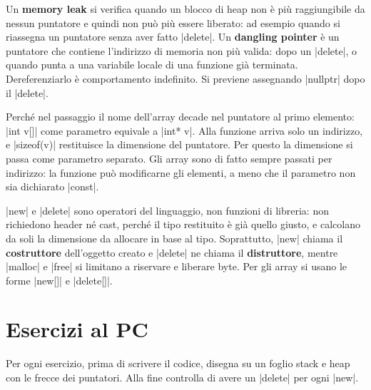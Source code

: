 \begin{orale}
Un \textbf{memory leak} si verifica quando un blocco di heap non è più
raggiungibile da nessun puntatore e quindi non può più essere liberato: ad
esempio quando si riassegna un puntatore senza aver fatto \cc|delete|. Un
\textbf{dangling pointer} è un puntatore che contiene l'indirizzo di memoria non
più valida: dopo un \cc|delete|, o quando punta a una variabile locale di una
funzione già terminata. Dereferenziarlo è comportamento indefinito. Si previene
assegnando \cc|nullptr| dopo il \cc|delete|.
\end{orale}

\begin{orale}
Perché nel passaggio il nome dell'array decade nel puntatore al primo elemento:
\cc|int v[]| come parametro equivale a \cc|int* v|. Alla funzione arriva solo un
indirizzo, e \cc|sizeof(v)| restituisce la dimensione del puntatore. Per questo
la dimensione si passa come parametro separato. Gli array sono di fatto sempre
passati per indirizzo: la funzione può modificarne gli elementi, a meno che il
parametro non sia dichiarato \cc|const|.
\end{orale}

\begin{orale}
\cc|new| e \cc|delete| sono operatori del linguaggio, non funzioni di libreria:
non richiedono header né cast, perché il tipo restituito è già quello giusto, e
calcolano da soli la dimensione da allocare in base al tipo. Soprattutto,
\cc|new| chiama il \textbf{costruttore} dell'oggetto creato e \cc|delete| ne chiama
il \textbf{distruttore}, mentre \cc|malloc| e \cc|free| si limitano a riservare e
liberare byte. Per gli array si usano le forme \cc|new[]| e \cc|delete[]|.
\end{orale}

\section{Esercizi al PC}

Per ogni esercizio, prima di scrivere il codice, disegna su un foglio stack e
heap con le frecce dei puntatori. Alla fine controlla di avere un \cc|delete|
per ogni \cc|new|.

